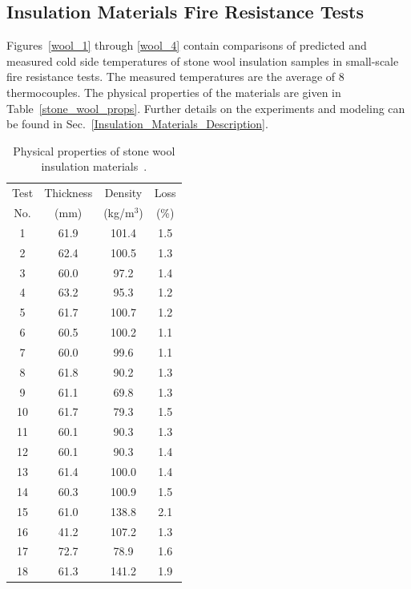 \clearpage

\subsection{Insulation Materials Fire Resistance Tests}

Figures~\ref{wool_1} through \ref{wool_4} contain comparisons of predicted and measured cold side temperatures of stone wool insulation samples in small-scale fire resistance tests. The measured temperatures are the average of 8 thermocouples. The physical properties of the materials are given in Table~\ref{stone_wool_props}. Further details on the experiments and modeling can be found in Sec.~\ref{Insulation_Materials_Description}.

\begin{table}[ht]
\caption[Property of Insulation Materials]
{Physical properties of stone wool insulation materials~\cite{Paudel:2021}.}
\begin{center}
\begin{tabular}{|c|c|c|c|}
\hline
Test & Thickness & Density    & Loss  \\
No.  & (mm)      & (kg/m$^3$) & (\%)  \\ \hline \hline
1  & 61.9  & 101.4  & 1.5  \\ \hline
2  & 62.4  & 100.5  & 1.3  \\ \hline
3  & 60.0  & 97.2   & 1.4  \\ \hline
4  & 63.2  & 95.3   & 1.2  \\ \hline
5  & 61.7  & 100.7  & 1.2  \\ \hline
6  & 60.5  & 100.2  & 1.1  \\ \hline
7  & 60.0  & 99.6   & 1.1  \\ \hline
8  & 61.8  & 90.2   & 1.3  \\ \hline
9  & 61.1  & 69.8   & 1.3  \\ \hline
10 & 61.7  & 79.3   & 1.5  \\ \hline
11 & 60.1  & 90.3   & 1.3  \\ \hline
12 & 60.1  & 90.3   & 1.4  \\ \hline
13 & 61.4  & 100.0  & 1.4  \\ \hline
14 & 60.3  & 100.9  & 1.5  \\ \hline
15 & 61.0  & 138.8  & 2.1  \\ \hline
16 & 41.2  & 107.2  & 1.3  \\ \hline
17 & 72.7  & 78.9   & 1.6  \\ \hline
18 & 61.3  & 141.2  & 1.9  \\ \hline

\end{tabular}
\end{center}
\end{table}
